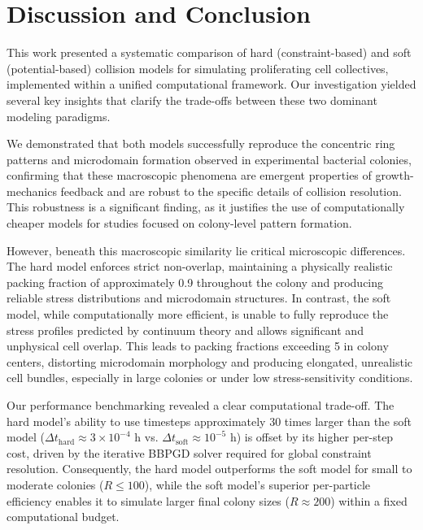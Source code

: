 \documentclass[conference]{IEEEtran}
\begin{document}
\clearpage
\newpage

\section{Discussion and Conclusion}

This work presented a systematic comparison of hard (constraint-based) and soft (potential-based) collision models for simulating proliferating cell collectives, implemented within a unified computational framework. Our investigation yielded several key insights that clarify the trade-offs between these two dominant modeling paradigms.

We demonstrated that both models successfully reproduce the concentric ring patterns and microdomain formation observed in experimental bacterial colonies, confirming that these macroscopic phenomena are emergent properties of growth-mechanics feedback and are robust to the specific details of collision resolution. This robustness is a significant finding, as it justifies the use of computationally cheaper models for studies focused on colony-level pattern formation.

However, beneath this macroscopic similarity lie critical microscopic differences. The hard model enforces strict non-overlap, maintaining a physically realistic packing fraction of approximately 0.9 throughout the colony and producing reliable stress distributions and microdomain structures. In contrast, the soft model, while computationally more efficient, is unable to fully reproduce the stress profiles predicted by continuum theory and allows significant and unphysical cell overlap. This leads to packing fractions exceeding 5 in colony centers, distorting microdomain morphology and producing elongated, unrealistic cell bundles, especially in large colonies or under low stress-sensitivity conditions.

Our performance benchmarking revealed a clear computational trade-off. The hard model's ability to use timesteps approximately 30 times larger than the soft model ($\Delta t_{\text{hard}} \approx 3 \times 10^{-4}$ h vs. $\Delta t_{\text{soft}} \approx 10^{-5}$ h) is offset by its higher per-step cost, driven by the iterative BBPGD solver required for global constraint resolution. Consequently, the hard model outperforms the soft model for small to moderate colonies ($R \leq 100$), while the soft model's superior per-particle efficiency enables it to simulate larger final colony sizes ($R \approx 200$) within a fixed computational budget.
\end{document}
